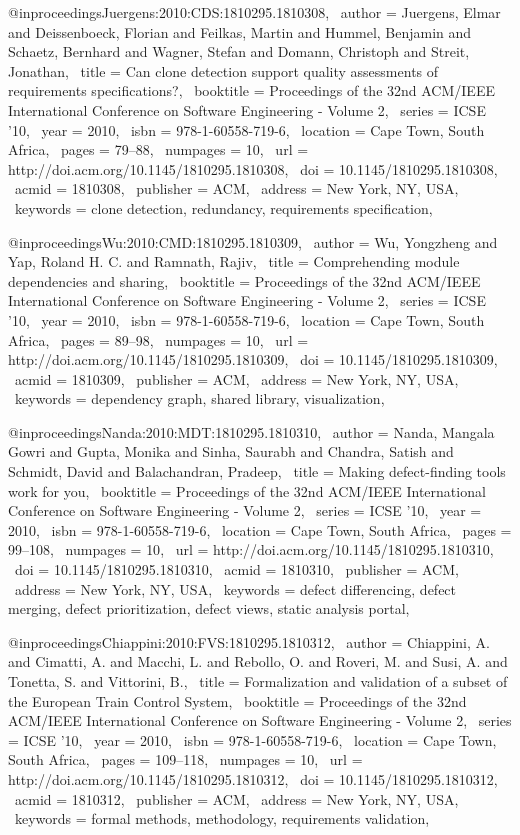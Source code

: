 @inproceedings{Juergens:2010:CDS:1810295.1810308,
 author = {Juergens, Elmar and Deissenboeck, Florian and Feilkas, Martin and Hummel, Benjamin and Schaetz, Bernhard and Wagner, Stefan and Domann, Christoph and Streit, Jonathan},
 title = {Can clone detection support quality assessments of requirements specifications?},
 booktitle = {Proceedings of the 32nd ACM/IEEE International Conference on Software Engineering - Volume 2},
 series = {ICSE '10},
 year = {2010},
 isbn = {978-1-60558-719-6},
 location = {Cape Town, South Africa},
 pages = {79--88},
 numpages = {10},
 url = {http://doi.acm.org/10.1145/1810295.1810308},
 doi = {10.1145/1810295.1810308},
 acmid = {1810308},
 publisher = {ACM},
 address = {New York, NY, USA},
 keywords = {clone detection, redundancy, requirements specification},
} 

@inproceedings{Wu:2010:CMD:1810295.1810309,
 author = {Wu, Yongzheng and Yap, Roland H. C. and Ramnath, Rajiv},
 title = {Comprehending module dependencies and sharing},
 booktitle = {Proceedings of the 32nd ACM/IEEE International Conference on Software Engineering - Volume 2},
 series = {ICSE '10},
 year = {2010},
 isbn = {978-1-60558-719-6},
 location = {Cape Town, South Africa},
 pages = {89--98},
 numpages = {10},
 url = {http://doi.acm.org/10.1145/1810295.1810309},
 doi = {10.1145/1810295.1810309},
 acmid = {1810309},
 publisher = {ACM},
 address = {New York, NY, USA},
 keywords = {dependency graph, shared library, visualization},
} 

@inproceedings{Nanda:2010:MDT:1810295.1810310,
 author = {Nanda, Mangala Gowri and Gupta, Monika and Sinha, Saurabh and Chandra, Satish and Schmidt, David and Balachandran, Pradeep},
 title = {Making defect-finding tools work for you},
 booktitle = {Proceedings of the 32nd ACM/IEEE International Conference on Software Engineering - Volume 2},
 series = {ICSE '10},
 year = {2010},
 isbn = {978-1-60558-719-6},
 location = {Cape Town, South Africa},
 pages = {99--108},
 numpages = {10},
 url = {http://doi.acm.org/10.1145/1810295.1810310},
 doi = {10.1145/1810295.1810310},
 acmid = {1810310},
 publisher = {ACM},
 address = {New York, NY, USA},
 keywords = {defect differencing, defect merging, defect prioritization, defect views, static analysis portal},
} 

@inproceedings{Chiappini:2010:FVS:1810295.1810312,
 author = {Chiappini, A. and Cimatti, A. and Macchi, L. and Rebollo, O. and Roveri, M. and Susi, A. and Tonetta, S. and Vittorini, B.},
 title = {Formalization and validation of a subset of the European Train Control System},
 booktitle = {Proceedings of the 32nd ACM/IEEE International Conference on Software Engineering - Volume 2},
 series = {ICSE '10},
 year = {2010},
 isbn = {978-1-60558-719-6},
 location = {Cape Town, South Africa},
 pages = {109--118},
 numpages = {10},
 url = {http://doi.acm.org/10.1145/1810295.1810312},
 doi = {10.1145/1810295.1810312},
 acmid = {1810312},
 publisher = {ACM},
 address = {New York, NY, USA},
 keywords = {formal methods, methodology, requirements validation},
} 

